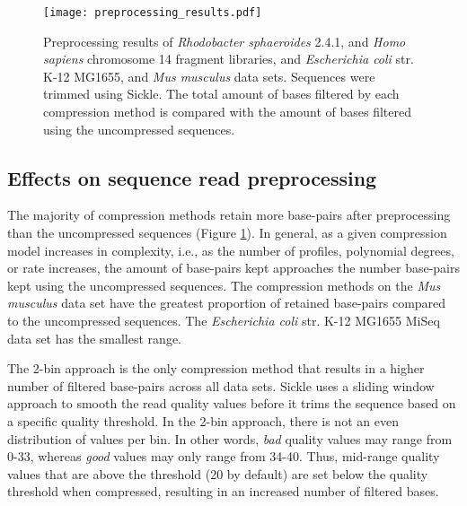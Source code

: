 \begin{figure}[!htb]%
\begin{center}
\texttt{[image: preprocessing\_results.pdf]}
\end{center}
\renewcommand{\baselinestretch}{1}
\small\normalsize
\begin{quote}
\caption[Preprocessing results of \textit{Rhodobacter sphaeroides}
  2.4.1, and \textit{Homo sapiens} chromosome 14 fragment libraries,
  and \textit{Escherichia coli} str. K-12 MG1655, and \textit{Mus
    musculus} data sets]{Preprocessing results of \textit{Rhodobacter sphaeroides}
  2.4.1, and \textit{Homo sapiens} chromosome 14 fragment libraries,
  and \textit{Escherichia coli} str. K-12 MG1655, and \textit{Mus
    musculus} data sets. Sequences were trimmed using Sickle. The
  total amount of bases filtered by each compression method is
  compared with the amount of bases filtered using the uncompressed
  sequences.}
  \label{fig:preprocessing}
\end{quote}
\end{figure}
\renewcommand{\baselinestretch}{2}
\small\normalsize

\subsection{Effects on sequence read preprocessing}

The majority of compression methods retain more base-pairs after
preprocessing than the uncompressed sequences (Figure
\ref{fig:preprocessing}). In general, as a given compression model
increases in complexity, i.e., as the number of profiles, polynomial
degrees, or rate increases, the amount of base-pairs kept approaches
the number base-pairs kept using the uncompressed sequences. The
compression methods on the \textit{Mus musculus} data set have the
greatest proportion of retained base-pairs compared to the
uncompressed sequences. The \textit{Escherichia coli} str. K-12
MG1655 MiSeq data set has the smallest range.

The 2-bin approach is the only compression method that results in a
higher number of filtered base-pairs across all data sets. Sickle
uses a sliding window approach to smooth the read quality values before
it trims the sequence based on a specific quality threshold. In the
2-bin approach, there is not an even distribution of values per bin.
In other words, \emph{bad} quality values may range from 0-33, whereas
\emph{good} values may only range from 34-40. Thus, mid-range quality
values that are above the threshold (20 by default) are set below the
quality threshold when compressed, resulting in an increased number of
filtered bases.

